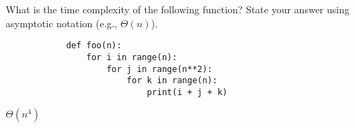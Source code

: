 \begin{prob}
    What is the time complexity of the following function?
    State your answer using asymptotic notation (e.g., $\Theta(n)$).

    \begin{verbatim}
            def foo(n):
                for i in range(n):
                    for j in range(n**2):
                        for k in range(n):
                            print(i + j + k)
    \end{verbatim}

    \begin{soln}
        $\Theta(n^4)$
    \end{soln}

\end{prob}
